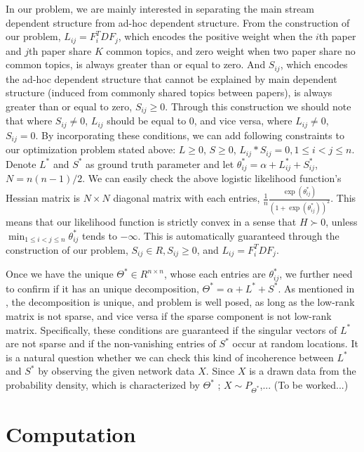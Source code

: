 \documentclass{article}
\begin{document}
\noindent In our problem, we are mainly interested in separating the main stream dependent structure from ad-hoc dependent structure. From the construction of our problem, $L_{ij} = F^T_{i}DF_{j}$, which encodes the positive weight when the $i$th paper and $j$th paper share $K$ common topics, and zero weight when two paper share no common topics, is always greater than or equal to zero. And $S_{ij}$, which encodes the ad-hoc dependent structure that cannot be explained by main dependent structure (induced from commonly shared topics between papers), is always greater than or equal to zero, $S_{ij} \geq 0$. Through this construction we should note that where $S_{ij}\neq0$, $L_{ij}$ should be equal to 0, and vice versa, where $L_{ij}\neq0$, $S_{ij}=0$. By incorporating these conditions, we can add following constraints to our optimization problem stated above: $L\geq 0$, $S \geq 0$, $L_{ij}*S_{ij}=0, {1\le i< j\le n}$. \\

\noindent Denote $L^*$ and $S^*$ as ground truth parameter and let $\theta^*_{ij}=\alpha+L^*_{ij}+S^*_{ij}$, $N=n(n-1)/2$. We can easily check the above logistic likelihood function's Hessian matrix is $N \times N$ diagonal matrix with each entries, $\frac{1}{n}\frac{\exp(\theta^*_{ij})}{(1+\exp(\theta^*_{ij}))^2}$. This means that our likelihood function is strictly convex in a sense that $H \succ 0$, unless $\min_{1\le i< j\le n}\theta^*_{ij}$ tends to $-\infty$. 
This is automatically guaranteed through the construction of our problem, $S_{ij} \in R, S_{ij} \geq 0$, and $L_{ij} = F^T_{i}DF_{j}$.

Once we have the unique $\Theta^* \in R^{n \times n}$, whose each entries are $\theta^*_{ij}$, we further need to confirm if it has an unique decomposition, $\Theta^*=\alpha+L^*+S^*$.
As mentioned in \cite{candes2011robust}, the decomposition is unique, and problem is well posed, as long as the low-rank matrix is not sparse, and vice versa if the sparse component is not low-rank matrix. Specifically, these conditions are guaranteed if the singular vectors of $L^*$ are not sparse and if the non-vanishing entries of $S^*$ occur at random locations. 
It is a natural question whether we can check this kind of incoherence between $L^*$ and $S^*$ by observing the given network data $X$. Since 
$X$ is a drawn data from the probability density, which is characterized by $\Theta^*$ ; $X\sim{P_{\Theta^*}}$,... (To be worked...)

\section{Computation}
\label{sec:compute}
\end{document}
